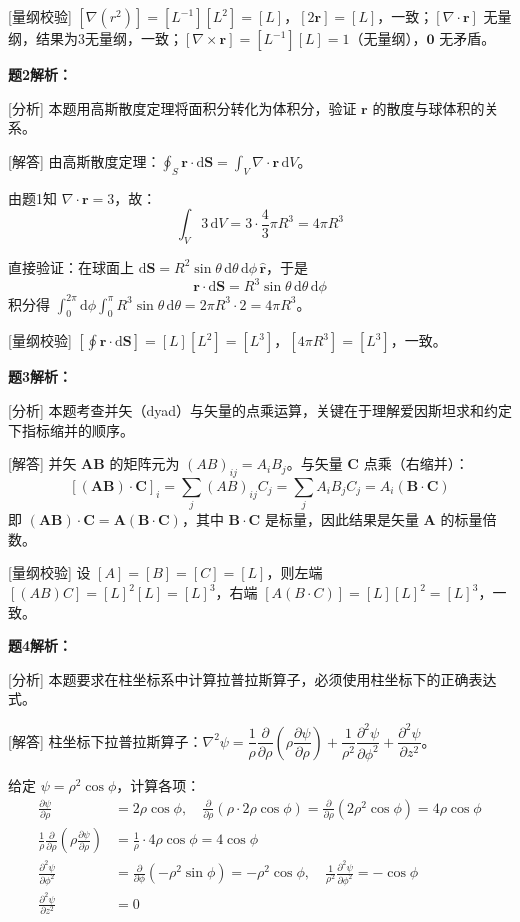 \documentclass[11pt,a4paper,openany,oneside]{book}
\newcommand{\diff}{\mathrm{d}}
\newcommand{\vect}[1]{\bm{#1}}
\newcommand{\unitvec}[1]{\hat{\vect{#1}}}
\newcommand{\grad}{\nabla}
\newcommand{\curl}{\nabla\times}
\newcommand{\divg}{\nabla\cdot}
\newcommand{\lap}{\nabla^2}
\begin{document}
[量纲校验] $[\grad(r^2)] = [L^{-1}][L^2] = [L]$，$[2\vect{r}] = [L]$，一致；$[\divg\vect{r}]$ 无量纲，结果为3无量纲，一致；$[\curl\vect{r}] = [L^{-1}][L] = 1$（无量纲），$\vect{0}$ 无矛盾。\qedsymbol

\textbf{题2解析：}

[分析] 本题用高斯散度定理将面积分转化为体积分，验证 $\vect{r}$ 的散度与球体积的关系。

[解答] 由高斯散度定理：$\displaystyle\oint_S \vect{r}\cdot\diff\vect{S} = \int_V \divg\vect{r}\,\diff V$。

由题1知 $\divg\vect{r} = 3$，故：
\[
\int_V 3\,\diff V = 3 \cdot \frac{4}{3}\pi R^3 = 4\pi R^3
\]

直接验证：在球面上 $\diff\vect{S} = R^2\sin\theta\,\diff\theta\,\diff\phi\,\unitvec{r}$，于是
\[
\vect{r}\cdot\diff\vect{S} = R^3\sin\theta\,\diff\theta\,\diff\phi
\]
积分得 $\displaystyle\int_0^{2\pi}\diff\phi\int_0^\pi R^3\sin\theta\,\diff\theta = 2\pi R^3 \cdot 2 = 4\pi R^3$。\qedsymbol

[量纲校验] $[\oint\vect{r}\cdot\diff\vect{S}] = [L][L^2] = [L^3]$，$[4\pi R^3] = [L^3]$，一致。\qedsymbol

\textbf{题3解析：}

[分析] 本题考查并矢（dyad）与矢量的点乘运算，关键在于理解爱因斯坦求和约定下指标缩并的顺序。

[解答] 并矢 $\bm{A}\bm{B}$ 的矩阵元为 $(AB)_{ij} = A_i B_j$。与矢量 $\bm{C}$ 点乘（右缩并）：
\[
[(\bm{A}\bm{B})\cdot\bm{C}]_i = \sum_j (AB)_{ij} C_j = \sum_j A_i B_j C_j = A_i (\bm{B}\cdot\bm{C})
\]
即 $(\bm{A}\bm{B})\cdot\bm{C} = \bm{A}(\bm{B}\cdot\bm{C})$，其中 $\bm{B}\cdot\bm{C}$ 是标量，因此结果是矢量 $\bm{A}$ 的标量倍数。\qedsymbol

[量纲校验] 设 $[A]=[B]=[C]=[L]$，则左端 $[(AB)C] = [L]^2[L] = [L]^3$，右端 $[A(B\cdot C)] = [L][L]^2 = [L]^3$，一致。\qedsymbol

\textbf{题4解析：}

[分析] 本题要求在柱坐标系中计算拉普拉斯算子，必须使用柱坐标下的正确表达式。

[解答] 柱坐标下拉普拉斯算子：$\lap\psi = \dfrac{1}{\rho}\dfrac{\partial}{\partial\rho}\left(\rho\dfrac{\partial\psi}{\partial\rho}\right) + \dfrac{1}{\rho^2}\dfrac{\partial^2\psi}{\partial\phi^2} + \dfrac{\partial^2\psi}{\partial z^2}$。

给定 $\psi = \rho^2\cos\phi$，计算各项：
\begin{align*}
\frac{\partial\psi}{\partial\rho} &= 2\rho\cos\phi, \quad \frac{\partial}{\partial\rho}\left(\rho\cdot 2\rho\cos\phi\right) = \frac{\partial}{\partial\rho}(2\rho^2\cos\phi) = 4\rho\cos\phi \\
\frac{1}{\rho}\frac{\partial}{\partial\rho}\left(\rho\frac{\partial\psi}{\partial\rho}\right) &= \frac{1}{\rho}\cdot 4\rho\cos\phi = 4\cos\phi \\
\frac{\partial^2\psi}{\partial\phi^2} &= \frac{\partial}{\partial\phi}(-\rho^2\sin\phi) = -\rho^2\cos\phi, \quad \frac{1}{\rho^2}\frac{\partial^2\psi}{\partial\phi^2} = -\cos\phi \\
\frac{\partial^2\psi}{\partial z^2} &= 0
\end{align*}
\end{document}
